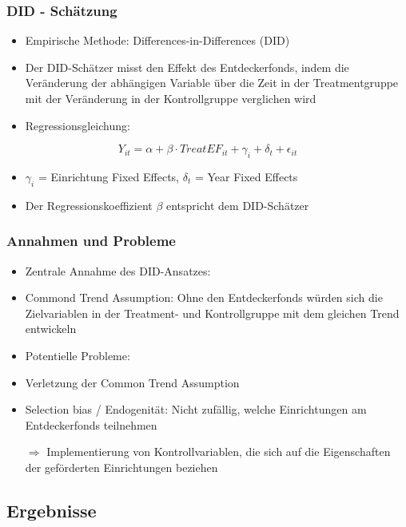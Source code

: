 \begin{frame}[fragile]
\frametitle{DID - Schätzung}
\begin{itemize}
\item Empirische Methode: Differences-in-Differences (DID)
\item Der DID-Schätzer misst den Effekt des Entdeckerfonds, indem die Veränderung der abhängigen Variable über die Zeit in der Treatmentgruppe mit der Veränderung in der Kontrollgruppe verglichen wird
\linebreak
\item Regressionsgleichung:
\end{itemize}

\begin{equation}
\label{DID equation}
  Y_{it} = \alpha + \beta \cdot TreatEF_{it} + \gamma_{i} + \delta_{t} + \epsilon_{it}
\end{equation}

\begin{itemize}
\item $\gamma_{i}$ = Einrichtung Fixed Effects, $\delta_{t}$ = Year Fixed Effects
\item Der Regressionskoeffizient $\beta$ entspricht dem DID-Schätzer
\end{itemize}
\end{frame}

\begin{frame}[fragile]
\frametitle{Annahmen und Probleme}
\begin{itemize}
\item Zentrale Annahme des DID-Ansatzes:
\item Commond Trend Assumption: Ohne den Entdeckerfonds würden sich die Zielvariablen in der Treatment- und Kontrollgruppe mit dem gleichen Trend entwickeln
\linebreak
\item Potentielle Probleme:
\item Verletzung der Common Trend Assumption
\item Selection bias / Endogenität: Nicht zufällig, welche Einrichtungen am Entdeckerfonds teilnehmen
\item [$\Rightarrow$] Implementierung von Kontrollvariablen, die sich auf die Eigenschaften der geförderten Einrichtungen beziehen
\end{itemize}
\end{frame}

\subsection{Ergebnisse}

